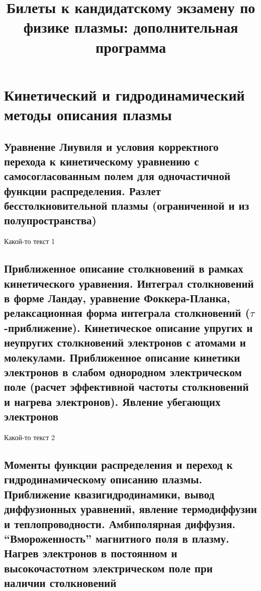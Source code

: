 \documentclass[10pt, a4paper]{article}
\numberwithin{equation}{section}
\begin{document}
\title{Билеты к кандидатскому экзамену по физике плазмы: дополнительная программа}

\maketitle

\section{Кинетический и гидродинамический методы описания плазмы}

\subsection{Уравнение Лиувиля и условия корректного перехода к кинетическому уравнению с самосогласованным полем для одночастичной функции распределения. Разлет бесстолкновительной плазмы (ограниченной и из полупространства)}

Какой-то текст 1

\subsection[Приближенное описание столкновений в рамках кинетического уравнения. Интеграл 
столкновений в форме Ландау, уравнение Фоккера-Планка, релаксационная форма интеграла 	столкновений ($\tau$-приближение). Кинетическое описание упругих и неупругих столкновений электронов с атомами и молекулами. Приближенное описание кинетики электронов в слабом однородном электрическом поле (расчет эффективной частоты столкновений и нагрева электронов). Явление убегающих электронов]{Приближенное описание столкновений в рамках кинетического уравнения. Интеграл столкновений в форме Ландау, уравнение Фоккера-Планка, релаксационная форма интеграла 	столкновений \linebreak ($\tau$-приближение). Кинетическое описание упругих и неупругих столкновений электронов с атомами и молекулами. Приближенное описание кинетики электронов в слабом однородном электрическом поле (расчет эффективной частоты столкновений и нагрева электронов). Явление убегающих электронов}

Какой-то текст 2

\subsection{Моменты функции распределения и переход к гидродинамическому описанию плазмы. Приближение квазигидродинамики, вывод диффузионных уравнений, явление термодиффузии и теплопроводности. Амбиполярная диффузия. ``Вмороженность'' магнитного поля в плазму. Нагрев электронов в постоянном и высокочастотном электрическом поле при наличии столкновений}
\end{document}
